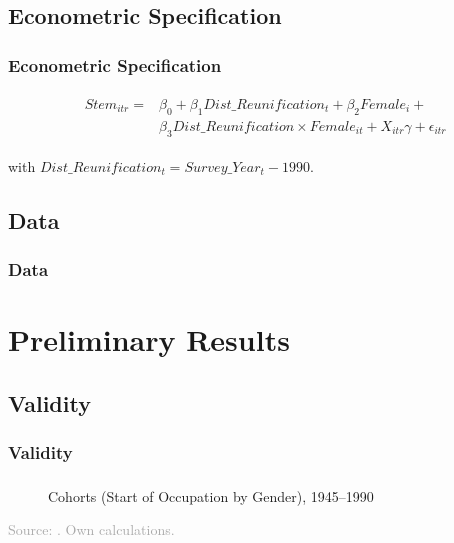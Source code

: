 \documentclass[11pt, aspectratio=1610, xcolor={dvipsnames}]{beamer}
\begin{document}
	\subsection{Econometric Specification}
	\begin{frame}
		\frametitle{Econometric Specification}
		
			{\linespread{1}\normalsize
				\begin{align}
					&\begin{aligned}
						\label{eq:spec}
						Stem_{itr} =& \beta_{0} + \beta_{1} Dist\_Reunification_{t} + \beta_{2} Female_{i} +\\
						&\beta_{3} Dist\_Reunification \times Female_{it} + X_{itr} \gamma + \epsilon_{itr}
					\end{aligned}
				\end{align}
				
				\vspace{1cm}
				
				\hspace{6.2em} with $Dist\_Reunification_{t} = Survey\_Year_{t} - 1990$.
			}
		
	\end{frame}
	
	\subsection{Data}
	\begin{frame}
		\frametitle{Data}
	\end{frame}
	
	\section{Preliminary Results}
	\begin{frame}
		\frametitle{}
	\end{frame}
	
	\subsection{Validity}
	\begin{frame}
		\frametitle{Validity}
	\end{frame}
	
	\begin{frame}
		\frametitle{}
		
		\begin{figure}[h]
			\centering
			\caption{Cohorts (Start of Occupation by Gender), 1945--1990}
			\label{fig:validity}
			\resizebox{75mm}{!}{}
		\end{figure}
		
		{\scriptsize
			\textcolor{darkgray}{Source: \cite{Mayer1995}. Own calculations.}
		}
		
	\end{frame}
	
\end{document}
